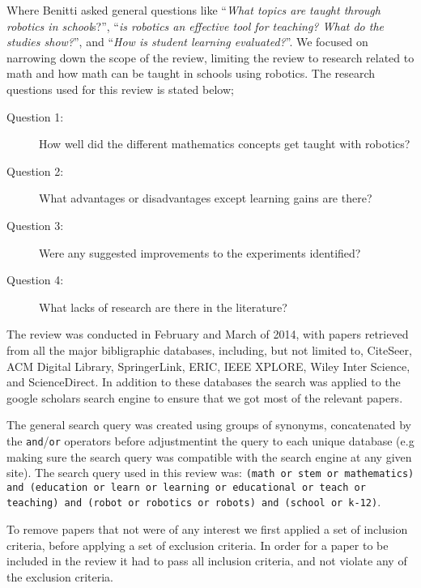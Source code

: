 \bigskip\noindent
Where Benitti asked general questions like "`\textit{What topics are taught through robotics in school}s?"', "`\textit{is robotics an effective tool for teaching? What do the studies show?}"', and "`\textit{How is student learning evaluated?}"'. We focused on narrowing down the scope of the review, limiting the review to research related to math and how math can be taught in schools using robotics.
The research questions used for this review is stated below; 
\begin{description}
	\item[Question 1: ] How well did the different mathematics concepts get taught with robotics?
	\item[Question 2: ] What advantages or disadvantages except learning gains are there?
	\item[Question 3: ] Were any suggested improvements to the experiments identified?
	\item[Question 4: ] What lacks of research are there in the literature?
\end{description}

\bigskip\noindent
The review was conducted in February and March of 2014, with papers retrieved from all the major bibligraphic databases, including, but not limited to, CiteSeer, ACM Digital Library, SpringerLink, ERIC, IEEE XPLORE, Wiley Inter Science, and ScienceDirect. In addition to these databases the search was applied to the google scholars search engine to ensure that we got most of the relevant papers.

\bigskip\noindent
The general search query was created using groups of synonyms, concatenated by the \texttt{and}/\texttt{or} operators before adjustmentint the query to each unique database (e.g making sure the search query was compatible with the search engine at any given site). The search query used in this review was: \texttt{(math or stem or mathematics) and (education or learn or learning or educational or teach or teaching) and (robot or robotics or robots) and (school or k-12)}. 

\bigskip\noindent
To remove papers that not were of any interest we first applied a set of inclusion criteria, before applying a set of exclusion criteria. In order for a paper to be included in the review it had to pass all inclusion criteria, and not violate any of the exclusion criteria. 


